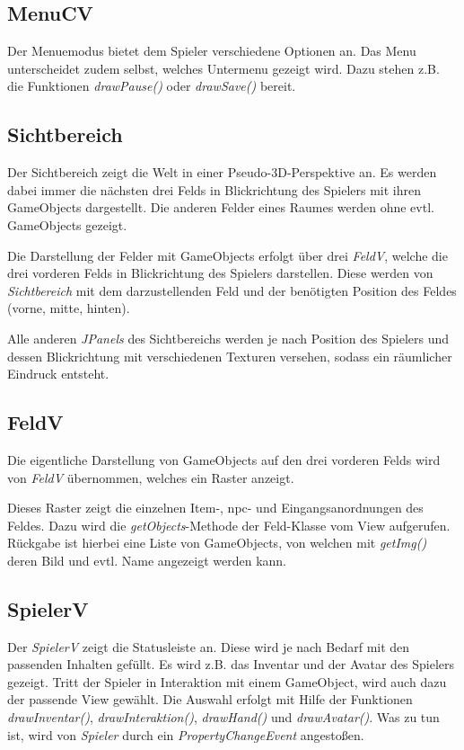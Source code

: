 \subsection{MenuCV}
Der \gls{Menuemodus} bietet dem \gls{Spieler} verschiedene Optionen an. Das Menu unterscheidet 
zudem selbst, welches Untermenu gezeigt wird. Dazu stehen z.B. die Funktionen \textit{drawPause()} 
oder \textit{drawSave()} bereit.

\subsection{Sichtbereich}
Der \gls{Sichtbereich} zeigt die \gls{Welt} in einer Pseudo-3D-Perspektive an. Es werden dabei immer 
die nächsten drei \glspl{Feld} in \gls{Blickrichtung} des \gls{Spieler}s mit ihren \glspl{GameObject} 
dargestellt. Die anderen Felder eines Raumes werden ohne evtl. \glspl{GameObject} gezeigt.

Die Darstellung der Felder mit \glspl{GameObject} erfolgt über drei \textit{FeldV}, welche die drei 
vorderen \glspl{Feld} in \gls{Blickrichtung} des \gls{Spieler}s darstellen. Diese werden von 
\textit{Sichtbereich} mit dem darzustellenden Feld und der benötigten Position des \gls{Feld}es 
(vorne, mitte, hinten).

Alle anderen \textit{JPanels} des \gls{Sichtbereich}s werden je nach Position des \gls{Spieler}s und 
dessen \gls{Blickrichtung} mit verschiedenen Texturen versehen, sodass ein räumlicher Eindruck entsteht.

\subsection{FeldV}
Die eigentliche Darstellung von \glspl{GameObject} auf den drei vorderen \glspl{Feld} wird von 
\textit{FeldV} übernommen, welches ein Raster anzeigt.

Dieses Raster zeigt die einzelnen \gls{Item}-, \gls{npc}- und \gls{Eingang}sanordnungen des 
\gls{Feld}es. Dazu wird die \textit{getObjects}-Methode der \gls{Feld}-Klasse vom View aufgerufen. 
Rückgabe ist hierbei eine Liste von \glspl{GameObject}, von welchen mit \textit{getImg()} deren 
Bild und evtl. Name angezeigt werden kann.

\subsection{SpielerV}
Der \textit{SpielerV} zeigt die Statusleiste an. Diese wird je nach Bedarf mit den passenden Inhalten 
gefüllt. Es wird z.B. das \gls{Inventar} und der Avatar des \gls{Spieler}s gezeigt. Tritt der 
\gls{Spieler} in Interaktion mit einem \gls{GameObject}, wird auch dazu der passende View gewählt. 
Die Auswahl erfolgt mit Hilfe der Funktionen \textit{drawInventar()}, \textit{drawInteraktion()}, 
\textit{drawHand()} und \textit{drawAvatar()}. Was zu tun ist, wird von \textit{Spieler} durch ein 
\textit{PropertyChangeEvent} angestoßen.

